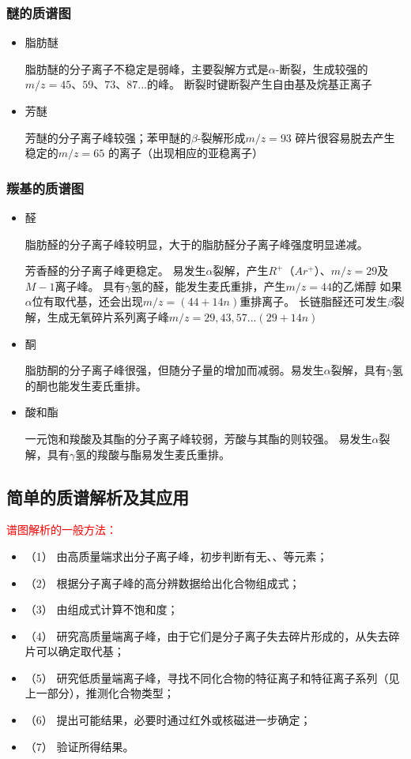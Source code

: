 \subsubsection*{醚的质谱图}
\begin{itemize}
    \item 脂肪醚
    
    脂肪醚的分子离子不稳定是弱峰，主要裂解方式是$\alpha $-断裂，生成较强的$m/z=45、59、73、87...$的峰。
    断裂时键断裂产生自由基及烷基正离子
    \item 芳醚
    
    芳醚的分子离子峰较强；苯甲醚的$\beta$-裂解形成$m/z=93$ 碎片很容易脱去产生稳定的$m/z=65$ 的离子（出现相应的亚稳离子）
\end{itemize}
\subsubsection*{羰基的质谱图}
\begin{itemize}
    \item  醛
    
    脂肪醛的分子离子峰较明显，大于的脂肪醛分子离子峰强度明显递减。
    
    芳香醛的分子离子峰更稳定。
    易发生$\alpha$裂解，产生$R^{+}$（$Ar^{+}$）、$m/z=29$及$M-1$离子峰。
    具有$\gamma$氢的醛，能发生麦氏重排，产生$m/z=44$的乙烯醇
    如果$\alpha$位有取代基，还会出现$m/z=(44+14n)$重排离子。
    长链脂醛还可发生$\beta$裂解，生成无氧碎片系列离子峰$m/z=29, 43, 57...(29+14n)$
    \item  酮
    
    脂肪酮的分子离子峰很强，但随分子量的增加而减弱。易发生$\alpha$裂解，具有$\gamma$氢的酮也能发生麦氏重排。
    \item 酸和酯
    
    一元饱和羧酸及其酯的分子离子峰较弱，芳酸与其酯的则较强。
    易发生$\alpha$裂解，具有$\gamma$氢的羧酸与酯易发生麦氏重排。
\end{itemize}

\subsection{简单的质谱解析及其应用}
\begin{note}
    

\textcolor{red}{谱图解析的一般方法：}
\begin{itemize}
    \item（1） 由高质量端求出分子离子峰，初步判断有无、、等元素；
    \item（2） 根据分子离子峰的高分辨数据给出化合物组成式；
    \item（3） 由组成式计算不饱和度；
    \item（4） 研究高质量端离子峰，由于它们是分子离子失去碎片形成的，从失去碎片可以确定取代基；
    \item（5） 研究低质量端离子峰，寻找不同化合物的特征离子和特征离子系列（见上一部分），推测化合物类型；
    \item（6） 提出可能结果，必要时通过红外或核磁进一步确定；
    \item（7） 验证所得结果。
\end{itemize}
\end{note}

